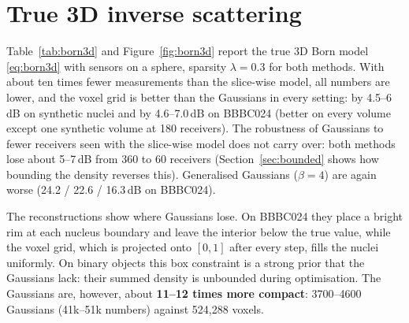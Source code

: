 \section{True 3D inverse scattering}
\label{sec:born3d}
Table~\ref{tab:born3d} and Figure~\ref{fig:born3d} report the true 3D Born model \eqref{eq:born3d} with sensors on a
sphere, sparsity $\lambda=0.3$ for both methods. With about ten times fewer measurements than the slice-wise model,
all numbers are lower, and the voxel grid is better than the Gaussians in every setting: by 4.5--6\,dB on synthetic
nuclei and by 4.6--7.0\,dB on BBBC024 (better on every volume except one synthetic volume at 180 receivers). The
robustness of Gaussians to fewer receivers seen with the slice-wise model does not carry over: both methods lose
about 5--7\,dB from 360 to 60 receivers (Section~\ref{sec:bounded} shows how bounding the density reverses this).
Generalised Gaussians ($\beta=4$) are again worse (24.2 / 22.6 / 16.3\,dB on
BBBC024).

The reconstructions show where Gaussians lose. On BBBC024 they place a bright rim at each nucleus boundary and leave
the interior below the true value, while the voxel grid, which is projected onto $[0,1]$ after every step, fills the
nuclei uniformly. On binary objects this box constraint is a strong prior that the Gaussians lack: their summed
density is unbounded during optimisation. The Gaussians are, however, about \textbf{11--12 times more compact}: 3700--4600
Gaussians (41k--51k numbers) against 524{,}288 voxels.

\begin{table}[h]
  \centering
  \caption{True 3D inverse scattering (3D Born model, 60 transmitters, receivers on a sphere), $32\times128\times128$
  volumes, sparsity $\lambda=0.3$ for both methods (PSNR dB / SSIM, mean of 3 volumes).}
  \label{tab:born3d}
\end{table}

